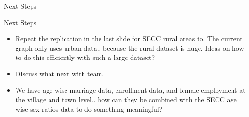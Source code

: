 \documentclass[aspectratio=169]{beamer}
\begin{document}
\begin{section}{Next Steps}
\begin{frame}{Next Steps}
  \begin{itemize}
    \item Repeat the replication in the last slide for SECC rural
      areas to. The current graph only uses urban data.. because the
      rural dataset is huge. Ideas on how to do this efficiently with
      such a large dataset?
    \item Discuss what next with team.
    \item We have age-wise marriage data, enrollment data, and female
      employment at the village and town level.. how can they be
      combined with the SECC age wise sex ratios data to do something
      meaningful?
  \end{itemize}
\end{frame}
\end{section}
\end{document}
